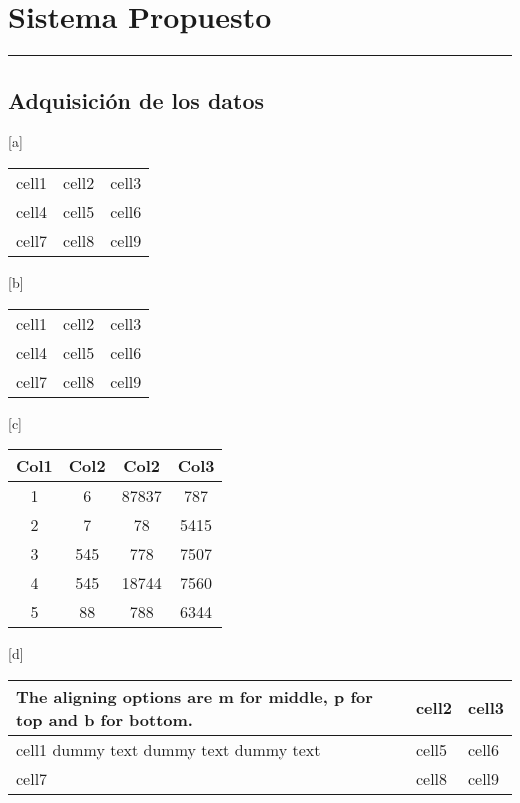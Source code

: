 \chapter{Sistema Propuesto}\label{capit:cap3}
\vspace{-2.0325ex}%
\noindent
\rule{\textwidth}{0.5pt}
\vspace{-5.5ex}%
\newcommand{\pushline}{\Indp}%

\section{Adquisición de los datos}


\begin{center}[a]
\begin{tabular}{ c c c }
 cell1 & cell2 & cell3 \\ 
 cell4 & cell5 & cell6 \\  
 cell7 & cell8 & cell9    
\end{tabular}
\end{center}

\begin{center}[b]
\begin{tabular}{ |c|c|c| } 
 \hline
 cell1 & cell2 & cell3 \\ 
 cell4 & cell5 & cell6 \\ 
 cell7 & cell8 & cell9 \\ 
 \hline
\end{tabular}
\end{center}

\begin{center}[c]
 \begin{tabular}{||c c c c||} 
 \hline
 Col1 & Col2 & Col2 & Col3 \\ [0.5ex] 
 \hline\hline
 1 & 6 & 87837 & 787 \\ 
 \hline
 2 & 7 & 78 & 5415 \\
 \hline
 3 & 545 & 778 & 7507 \\
 \hline
 4 & 545 & 18744 & 7560 \\
 \hline
 5 & 88 & 788 & 6344 \\ [1ex] 
 \hline
\end{tabular}
\end{center}

\begin{center}[d]
\begin{tabular}{ | b{5cm} | m{2cm}| m{2cm} | } 
\hline
The aligning options are m for middle, p for top and b for bottom.& cell2 & cell3 \\ 
\hline
cell1 dummy text dummy text dummy text & cell5 & cell6 \\ 
\hline
cell7 & cell8 & cell9 \\ 
\hline
\end{tabular}
\end{center}

